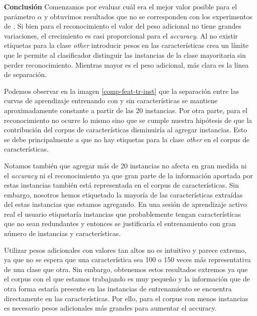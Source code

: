 \textbf{Conclusión}
Comenzamos por evaluar cuál era el mejor valor posible para el parámetro $\alpha$ y obtuvimos resultados que no se corresponden con los experimentos de \citet{dualist}. Si bien para el reconocimiento el valor del peso adicional no tiene grandes variaciones, el crecimiento es casi proporcional para el \textit{accuracy}. Al no existir etiquetas para la clase \textit{other} introducir pesos en las características crea un límite que le permite al clasificador distinguir las instancias de la clase mayoritaria sin perder reconocimiento. Mientras mayor es el peso adicional, más clara es la línea de separación.

Podemos observar en la imagen \ref{comp-feat-tr-inst} que la separación entre las curvas de aprendizaje entrenando con y sin características se mantiene aproximadamente constante a partir de las 20 instancias. Por otra parte, para el reconocimiento no ocurre lo mismo sino que se cumple nuestra hipótesis de que la contribución del corpus de características disminuiría al agregar instancias. Esto se debe principalmente a que no hay etiquetas para la clase \textit{other} en el corpus de características.

Notamos también que agregar más de 20 instancias no afecta en gran medida ni el \textit{accuracy} ni el reconocimiento ya que gran parte de la información aportada por estas instancias también está representada en el corpus de características. Sin embargo, nosotros hemos etiquetado la mayoría de las características extraídas del estas instancias que estamos agregando. En una sesión de aprendizaje activo real el usuario etiquetaría instancias que probablemente tengan características que no sean redundantes y entonces se justificaría el entrenamiento con gran número de instancias y características.

Utilizar pesos adicionales con valores tan altos no es intuitivo y parece extremo, ya que no se espera que una característica sea 100 o 150 veces más representativa de una clase que otra. Sin embargo, obtenemos estos resultados extremos ya que el corpus con el que estamos trabajando es muy pequeño y la información que de otra forma estaría presente en las instancias de entrenamiento se encuentra directamente en las características. Por ello, para el corpus con menos instancias es necesario pesos adicionales más grandes para aumentar el accuracy.



